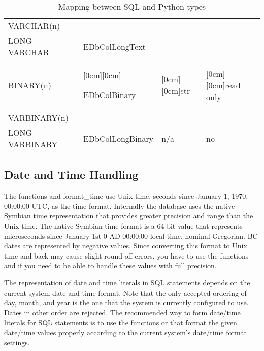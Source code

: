 \begin{table}[htbp]
\begin{center}
\begin{tabular}{|p{117pt}|p{144pt}|p{99pt}|p{63pt}|}
\cline{1-1} 
\textsf{VARCHAR(n)}& 
 & 
 & 
  \\
\cline{1-2} 
\textsf{LONG VARCHAR}& 
\textsf{EDbColLongText}& 
 & 
  \\
\hline
\textsf{BINARY(n)}& 
\raisebox{-1.50ex}[0cm][0cm]{\textsf{EDbColBinary} \par \textsf{}}& 
\raisebox{-1.50ex}[0cm][0cm]{str}& 
\raisebox{-1.50ex}[0cm][0cm]{read only} \\
\cline{1-1} 
\textsf{VARBINARY(n)}& 
 & 
 & 
  \\
\hline
\textsf{LONG VARBINARY}& 
\textsf{EDbColLongBinary}& 
n/a& 
no \\
\hline
\end{tabular}
\caption{Mapping between SQL and Python types}
\label{tab:sqltypes}
\end{center}
\end{table}


\subsection{Date and Time Handling}
\label{subsec:mylabel15}
The functions  and \textsf{format_time} use Unix time, 
seconds since January 1, 1970, 00:00:00 UTC, as the time format. Internally 
the database uses the native Symbian time representation that provides 
greater precision and range than the Unix time. The native Symbian time 
format is a 64-bit value that represents microseconds since January 1st 0 AD 
00:00:00 local time, nominal Gregorian. BC dates are represented by negative 
values. Since converting this format to Unix time and back may cause slight 
round-off errors, you have to use the functions  and 
 if you need to be able to handle these values 
with full precision.

The representation of date and time literals in SQL statements depends on 
the current system date and time format. Note that the only accepted 
ordering of day, month, and year is the one that the system is currently 
configured to use. Dates in other order are rejected. The recommended way to 
form date/time literals for SQL statements is to use the functions 
 or  that format the given 
date/time values properly according to the current system's date/time format 
settings.

